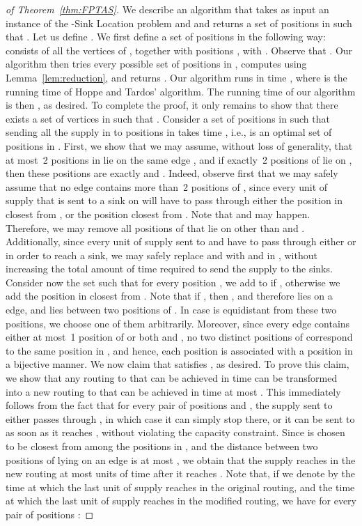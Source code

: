 \documentclass[a4paper,10pt]{llncs}
\begin{document}
\begin{proof}[of Theorem~\ref{thm:FPTAS}]
We describe an algorithm that takes as input an instance  of the -{\sc Sink Location} problem and  and returns a set of  positions  in  such that . Let us define . 
We first define a set  of positions in the following way:  consists of all the vertices of , together with positions , with  . Observe that . Our algorithm then tries every possible set  of  positions in , computes  using Lemma~\ref{lem:reduction}, and returns . Our algorithm runs in time , where  is the running time of Hoppe and Tardos' algorithm. The running time of our algorithm is then , as desired.
To complete the proof, it only remains to show that there exists a set  of  vertices in  such that .
Consider a set of  positions  in  such that sending all the supply in  to positions in  takes time , i.e.,  is an optimal set of positions in . First, we show that we may assume, without loss of generality, that at most~2 positions in  lie on the same edge , and if exactly~2 positions of  lie on , then these positions are exactly  and . Indeed, observe first that we may safely assume that no edge  contains more than~2 positions of , since every unit of supply that is sent to a sink on  will have to pass through either the position  in  closest from , or the position  closest from . Note that  and  may happen. Therefore, we may remove all positions of  that lie on  other than  and . Additionally, since every unit of supply sent to  and  have to pass through either  or  in order to reach a sink, we may safely replace  and  with  and  in , without increasing the total amount of time required to send the supply to the sinks.
Consider now the set  such that for every position , we add  to  if , otherwise we add the position  in  closest from . Note that if , then , and therefore  lies on a edge, and lies between two positions of . In case  is equidistant from these two positions, we choose one of them arbitrarily. Moreover, since every edge  contains either at most~1 position of  or both  and , no two distinct positions of  correspond to the same position  in , and hence, each position  is associated with a position  in a bijective manner.
We now claim that  satisfies , as desired.
To prove this claim, we show that any routing to  that can be achieved in time  can be transformed into a new routing to  that can be achieved in time at most . This immediately follows from the fact that for every pair of positions  and , the supply sent to  either passes through , in which case it can simply stop there, or it can be sent to  as soon as it reaches , without violating the capacity constraint. Since  is chosen to be closest from  among the positions in , and the distance between two positions of  lying on an edge  is at most , we obtain that the supply reaches  in the new routing at most  units of time after it reaches . Note that, if we denote by  the time at which the last unit of supply reaches  in the original routing, and  the time at which the last unit of supply reaches  in the modified routing, we have for every pair of positions :


\end{proof}
\end{document}
